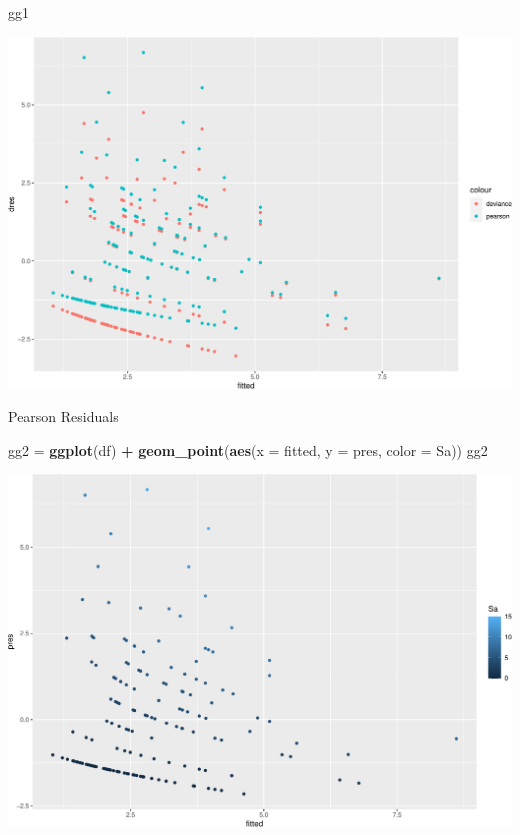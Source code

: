 \documentclass[
  ignorenonframetext,
]{beamer}
\newenvironment{Shaded}{\begin{snugshade}}{\end{snugshade}}
\newcommand{\AttributeTok}[1]{\textcolor[rgb]{0.13,0.29,0.53}{#1}}
\newcommand{\FunctionTok}[1]{\textcolor[rgb]{0.13,0.29,0.53}{\textbf{#1}}}
\newcommand{\NormalTok}[1]{#1}
\newcommand{\OtherTok}[1]{\textcolor[rgb]{0.56,0.35,0.01}{#1}}
\newcommand{\SpecialCharTok}[1]{\textcolor[rgb]{0.81,0.36,0.00}{\textbf{#1}}}
\begin{document}
\begin{frame}[fragile]
\begin{Shaded}
\begin{Highlighting}[]
\NormalTok{gg1}
\end{Highlighting}
\end{Shaded}

\includegraphics{Module04PoissonGammaPresentationWeek2_files/figure-beamer/unnamed-chunk-4-1.pdf}
\end{frame}

\begin{frame}[fragile]
\begin{block}{Pearson Residuals}
\protect\hypertarget{pearson-residuals-1}{}
\begin{Shaded}
\begin{Highlighting}[]
\NormalTok{gg2 }\OtherTok{=} \FunctionTok{ggplot}\NormalTok{(df) }\SpecialCharTok{+} \FunctionTok{geom\_point}\NormalTok{(}\FunctionTok{aes}\NormalTok{(}\AttributeTok{x =}\NormalTok{ fitted, }\AttributeTok{y =}\NormalTok{ pres, }\AttributeTok{color =}\NormalTok{ Sa))}
\NormalTok{gg2}
\end{Highlighting}
\end{Shaded}

\includegraphics{Module04PoissonGammaPresentationWeek2_files/figure-beamer/unnamed-chunk-5-1.pdf}
\end{block}
\end{frame}
\end{document}

